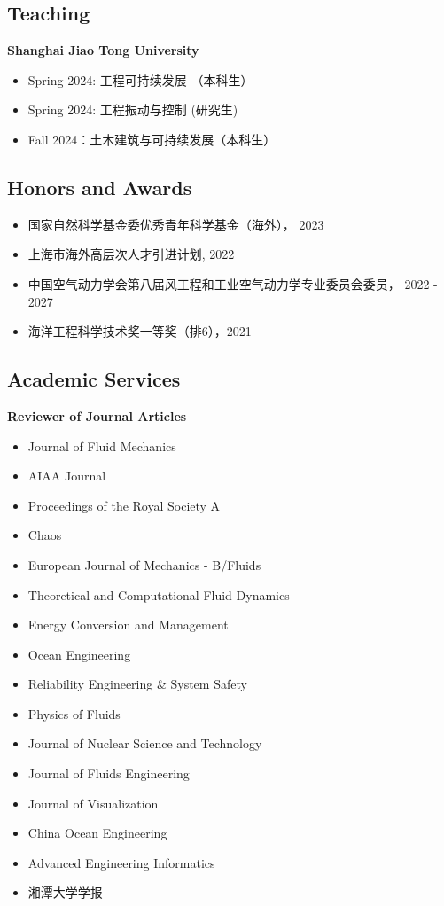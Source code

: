 \documentclass[10pt]{article}
\newenvironment{myitemize}
{ \begin{itemize}
    \setlength{\itemsep}{0pt}
    \setlength{\parskip}{0pt}
    \setlength{\parsep}{0pt}     }
{ \end{itemize}                  }
\begin{document}
\subsection*{Teaching}
{\bf \color{Blue}Shanghai Jiao Tong University}
	\begin{myitemize}
	\item Spring 2024: 工程可持续发展 （本科生）
	\item Spring 2024: 工程振动与控制 (研究生)
	\item Fall 2024：土木建筑与可持续发展（本科生）
	\end{myitemize}


\subsection*{Honors and Awards}
\begin{myitemize}
\item 国家自然科学基金委优秀青年科学基金（海外）， 2023
\item 上海市海外高层次人才引进计划, 2022
\item 中国空气动力学会第八届风工程和工业空气动力学专业委员会委员， 2022 - 2027
\item 海洋工程科学技术奖一等奖（排6），2021
\end{myitemize}




\vspace{-0.1in}
\subsection*{Academic Services}
{\bf \color{Blue}Reviewer of Journal Articles}
\vspace{-0.05in}
	\begin{myitemize}
 	\item Journal of Fluid Mechanics
	\item AIAA Journal
	\item Proceedings of the Royal Society A
	\item Chaos
	\item European Journal of Mechanics - B/Fluids
 	\item Theoretical and Computational Fluid Dynamics
	\item Energy Conversion and Management
	\item Ocean Engineering
	\item Reliability Engineering \& System Safety
	\item Physics of Fluids
	\item Journal of Nuclear Science and Technology
	\item Journal of Fluids Engineering
	\item Journal of Visualization
	\item China Ocean Engineering
	\item Advanced Engineering Informatics
	\item 湘潭大学学报
	\end{myitemize}
	
\end{document}
